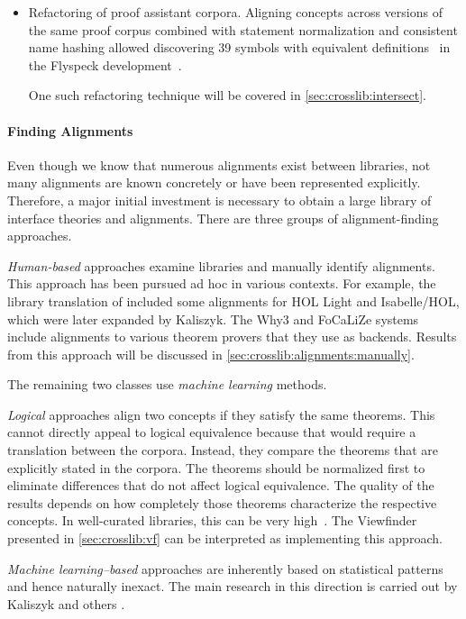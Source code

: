 \begin{itemize}
  Translations along alignments will be covered in \autoref{sec:crosslib:translate}.
\item Refactoring of proof assistant corpora. Aligning concepts across versions of the same
  proof corpus combined with statement normalization and consistent name hashing allowed
  discovering 39 symbols with equivalent definitions~\cite{ckju-mcs-hh} in the Flyspeck
  development~\cite{hales-pisigma15}.
  
  One such refactoring technique will be covered in \autoref{sec:crosslib:intersect}.
\end{itemize}

\paragraph{Finding Alignments}
Even though we know that numerous alignments exist between libraries, not many alignments are known concretely or have been represented explicitly.
Therefore, a major initial investment is necessary to obtain a large library of interface theories and alignments.
There are three groups of alignment-finding approaches.

\emph{Human-based} approaches examine libraries and manually identify alignments.
This approach has been pursued ad hoc in various contexts.
For example, the library translation of \cite{Obua2006} included some alignments for HOL Light and Isa\-belle/HOL, which were later expanded by Kaliszyk.
The Why3 and FoCaLiZe systems include alignments to various theorem provers that they use as backends.
Results from this approach will be discussed in \autoref{sec:crosslib:alignments:manually}.

The remaining two classes use \emph{machine learning} methods.

\emph{Logical} approaches align two concepts if they satisfy the same theorems.
This cannot directly appeal to logical equivalence because that would require a translation between the corpora.
Instead, they compare the theorems that are explicitly stated in the corpora. %
The theorems should be normalized first to eliminate differences that do not affect logical equivalence.
The quality of the results depends on how completely those theorems characterize the respective concepts.
In well-curated libraries, this can be very high~\cite{KohMue:cicm15}. The Viewfinder presented in \autoref{sec:crosslib:vf} can be interpreted as implementing this approach.

\emph{Machine learning--based} approaches are inherently based on statistical patterns and hence naturally inexact.
The main research in this direction is carried out by Kaliszyk and others \cite{tgck-cicm14}.

